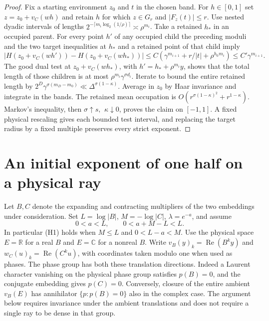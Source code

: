 \documentclass[11pt,a4paper]{article}
\begin{document}
\begin{proof}
Fix a starting environment $z_0$ and $t$ in the chosen band. For $h\in[0,1]$ set $z=z_0+v_C(wh)$ and
retain $h$ for which $z\in G_r$ and $|F_z(t)|\le r$.
Use nested dyadic intervals of lengths
$2^{-\lceil m_i\log_2(1/\rho)\rceil}\asymp\rho^{m_i}$.
Take a retained $h_*$ in an occupied parent. For every point $h'$
of any occupied child the preceding moduli and the two target
inequalities at $h_*$ and a retained point of that child imply
\[
 |H(z_0+v_C(wh'))-H(z_0+v_C(wh_*))|
 \le C(\gamma^{m_{i+1}}+r/|t|+\rho^{h_0m_i})
 \le C'\gamma^{m_{i+1}} .
\]
The good dual test at $z_0+v_C(wh_*)$, with
$h'=h_*+\rho^{m_i}y$, shows that the total length of those children
is at most $\rho^{m_i}\gamma^{\sigma d_i}$. Iterate to bound the
entire retained length by
$2^D\gamma^{\sigma(m_D-m_0)}\ll\Delta^{\sigma(1-\kappa)}$.
Average in $z_0$ by Haar invariance and integrate in the bands.
The retained mean occupation is
$O(r^{\sigma(1-\kappa)^2}+r^{1-\kappa})$. Markov's inequality,
then $\sigma\uparrow s,\ \,\kappa\downarrow0$, proves the claim on $[-1,1]$. A fixed physical rescaling gives each bounded test interval, and replacing the target radius by a fixed multiple preserves every strict exponent.

\end{proof}

\section{An initial exponent of one half on a physical ray}\label{sec:ray-half-seed}
Let $B,C$ denote the expanding and contracting multipliers of the
two embeddings under consideration. Set $L=\log|B|$, $M=-\log|C|$,
$\lambda=e^{-a}$, and assume
\[
          0<a<L,\qquad 0<a+M-L<L.                         \tag{H1}
\]
In particular (H1) holds when $M\le L$ and $0<L-a<M$.
Use the physical space $E=\mathbb R$ for a real $B$ and
$E=\mathbb C$ for a nonreal $B$. Write $v_B(y)_k=\operatorname{Re}(B^k y)$
and $w_C(u)_k=\operatorname{Re}(C^k u)$, with coordinates taken modulo one
when used as phases. The phase group has both these translation directions.
Indeed a Laurent character vanishing on the physical phase group satisfies
$p(B)=0$, and the conjugate embedding gives $p(C)=0$. Conversely, closure of
the entire ambient $v_B(E)$ has annihilator $\{p:p(B)=0\}$ also in the
complex case. The argument below requires invariance under the ambient
translations and does not require a single ray to be dense in that group.
\end{document}
